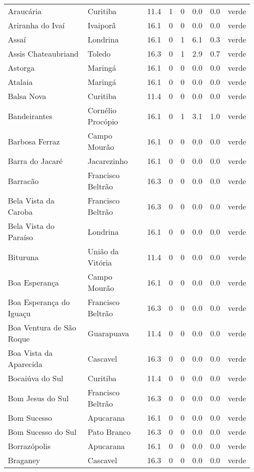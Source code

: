 \begin{longtable}{l|lllllll}
  Araucária & Curitiba & 11.4 & 1 & 0 & 0.0 & 0.0 & verde \\ 
  Ariranha do Ivaí & Ivaiporã & 16.1 & 0 & 0 & 0.0 & 0.0 & verde \\ 
  Assaí & Londrina & 16.1 & 0 & 1 & 6.1 & 0.3 & verde \\ 
  Assis Chateaubriand & Toledo & 16.3 & 0 & 1 & 2.9 & 0.7 & verde \\ 
  Astorga & Maringá & 16.1 & 0 & 0 & 0.0 & 0.0 & verde \\ 
  Atalaia & Maringá & 16.1 & 0 & 0 & 0.0 & 0.0 & verde \\ 
  Balsa Nova & Curitiba & 11.4 & 0 & 0 & 0.0 & 0.0 & verde \\ 
  Bandeirantes & Cornélio Procópio & 16.1 & 0 & 1 & 3.1 & 1.0 & verde \\ 
  Barbosa Ferraz & Campo Mourão & 16.1 & 0 & 0 & 0.0 & 0.0 & verde \\ 
  Barra do Jacaré & Jacarezinho & 16.1 & 0 & 0 & 0.0 & 0.0 & verde \\ 
  Barracão & Francisco Beltrão & 16.3 & 0 & 0 & 0.0 & 0.0 & verde \\ 
  Bela Vista da Caroba & Francisco Beltrão & 16.3 & 0 & 0 & 0.0 & 0.0 & verde \\ 
  Bela Vista do Paraíso & Londrina & 16.1 & 0 & 0 & 0.0 & 0.0 & verde \\ 
  Bituruna & União da Vitória & 11.4 & 0 & 0 & 0.0 & 0.0 & verde \\ 
  Boa Esperança & Campo Mourão & 16.1 & 0 & 0 & 0.0 & 0.0 & verde \\ 
  Boa Esperança do Iguaçu & Francisco Beltrão & 16.3 & 0 & 0 & 0.0 & 0.0 & verde \\ 
  Boa Ventura de São Roque & Guarapuava & 11.4 & 0 & 0 & 0.0 & 0.0 & verde \\ 
  Boa Vista da Aparecida & Cascavel & 16.3 & 0 & 0 & 0.0 & 0.0 & verde \\ 
  Bocaiúva do Sul & Curitiba & 11.4 & 0 & 0 & 0.0 & 0.0 & verde \\ 
  Bom Jesus do Sul & Francisco Beltrão & 16.3 & 0 & 0 & 0.0 & 0.0 & verde \\ 
  Bom Sucesso & Apucarana & 16.1 & 0 & 0 & 0.0 & 0.0 & verde \\ 
  Bom Sucesso do Sul & Pato Branco & 16.3 & 0 & 0 & 0.0 & 0.0 & verde \\ 
  Borrazópolis & Apucarana & 16.1 & 0 & 0 & 0.0 & 0.0 & verde \\ 
  Braganey & Cascavel & 16.3 & 0 & 0 & 0.0 & 0.0 & verde \\ 

\end{longtable}
